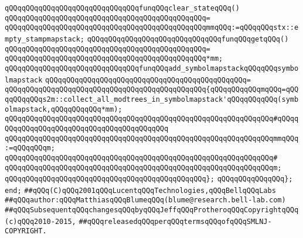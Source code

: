 \newline
\verb|qQQqqQQqqQQqqQQqqQQqqQQqqQQqqQQqfunqQQqclear_stateqQQq()|\newline
\verb|qQQqqQQqqQQqqQQqqQQqqQQqqQQqqQQqqQQqqQQqqQQqqQQq=|\newline
\verb|qQQqqQQqqQQqqQQqqQQqqQQqqQQqqQQqqQQqqQQqqQQqqQQqmmqQQq:=qQQqqQQqstx::empty_stampmapstack;|\newline
\newline
\verb|qQQqqQQqqQQqqQQqqQQqqQQqqQQqqQQqfunqQQqgetqQQq()|\newline
\verb|qQQqqQQqqQQqqQQqqQQqqQQqqQQqqQQqqQQqqQQqqQQqqQQq=|\newline
\verb|qQQqqQQqqQQqqQQqqQQqqQQqqQQqqQQqqQQqqQQqqQQqqQQq*mm;|\newline
\newline
\verb|qQQqqQQqqQQqqQQqqQQqqQQqqQQqqQQqfunqQQqadd_symbolmapstackqQQqqQQqsymbolmapstack|\newline
\verb|qQQqqQQqqQQqqQQqqQQqqQQqqQQqqQQqqQQqqQQqqQQqqQQq=|\newline
\verb|qQQqqQQqqQQqqQQqqQQqqQQqqQQqqQQqqQQqqQQqqQQqqQQq{qQQqqQQqqQQqmqQQq=qQQqqQQqqQQqs2m::collect_all_modtrees_in_symbolmapstack'qQQqqQQqqQQq(symbolmapstack,qQQqqQQqqQQq*mm);|\newline
\verb|qQQqqQQqqQQqqQQqqQQqqQQqqQQqqQQqqQQqqQQqqQQqqQQqqQQqqQQqqQQqqQQq#qQQqqQQqqQQqqQQqqQQqqQQqqQQqqQQqqQQqqQQqqQQq|\newline
\verb|qQQqqQQqqQQqqQQqqQQqqQQqqQQqqQQqqQQqqQQqqQQqqQQqqQQqqQQqqQQqqQQqmmqQQq:=qQQqqQQqm;|\newline
\verb|qQQqqQQqqQQqqQQqqQQqqQQqqQQqqQQqqQQqqQQqqQQqqQQqqQQqqQQqqQQqqQQq#|\newline
\verb|qQQqqQQqqQQqqQQqqQQqqQQqqQQqqQQqqQQqqQQqqQQqqQQqqQQqqQQqqQQqqQQqm;|\newline
\verb|qQQqqQQqqQQqqQQqqQQqqQQqqQQqqQQqqQQqqQQqqQQqqQQq};|\newline
\verb|qQQqqQQqqQQqqQQq};|\newline
\verb|end;|\newline
\newline
\newline
\newline
\verb|##qQQq(C)qQQq2001qQQqLucentqQQqTechnologies,qQQqBellqQQqLabs|\newline
\verb|##qQQqauthor:qQQqMatthiasqQQqBlumeqQQq(blume@research.bell-lab.com)|\newline
\verb|##qQQqSubsequentqQQqchangesqQQqbyqQQqJeffqQQqProtheroqQQqCopyrightqQQq(c)qQQq2010-2015,|\newline
\verb|##qQQqreleasedqQQqperqQQqtermsqQQqofqQQqSMLNJ-COPYRIGHT.|\newline

